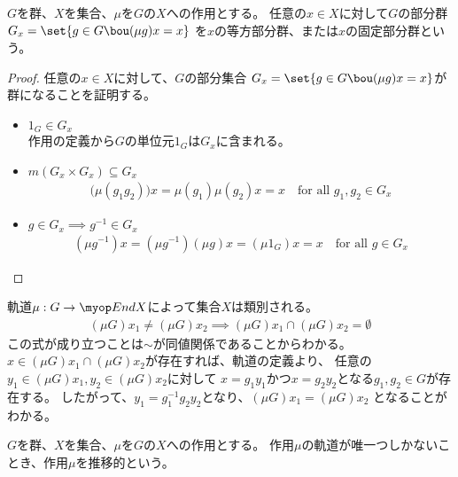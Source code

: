 	\begin{definition}[等方部分群]\label{def:等方部分群} %
		$G$を群、$X$を集合、$\mu$を$G$の$X$への作用とする。
		任意の$x\in X$に対して$G$の部分群$G_x=\set{g\in G\bou (\mu g)x=x}$
		を$x$の等方部分群、または$x$の固定部分群という。
	\end{definition} %
	\begin{proof} %
		任意の$x\in X$に対して、$G$の部分集合
		$G_x=\set{g\in G\bou (\mu g)x=x}$が群になることを証明する。
		\begin{itemize}\setlength{\itemsep}{-1mm} %
			\item $1_G\in G_x$ \\
			作用の定義から$G$の単位元$1_G$は$G_x$に含まれる。
			\item $m(G_x\times G_x)\subseteq G_x$
			\begin{equation*}\begin{split} %
				\bigl(\mu(g_1g_2)\bigr)x = \mu(g_1)\mu(g_2)x = x
				\quad\text{for all }g_1,g_2\in G_x
			\end{split}\end{equation*} %
			\item $g\in G_x\implies g^{-1}\in G_x$
			\begin{equation*}\begin{split} %
				(\mu g^{-1})x = (\mu g^{-1})(\mu g)x = (\mu 1_G)x = x
				\quad\text{for all }g\in G_x
			\end{split}\end{equation*} %
		\end{itemize} %
	\end{proof} %

	軌道$\mu:G\to\End X$によって集合$X$は類別される。
	\begin{equation*}\begin{split} %
		(\mu G)x_1 \neq (\mu G)x_2 
		\implies (\mu G)x_1 \cap (\mu G)x_2 = \emptyset
	\end{split}\end{equation*} %
	この式が成り立つことは$\sim$が同値関係であることからわかる。
	$x\in (\mu G)x_1 \cap (\mu G)x_2$が存在すれば、軌道の定義より、
	任意の$y_1\in (\mu G)x_1,y_2\in (\mu G)x_2$に対して
	$x = g_1y_1$かつ$x = g_2y_2$となる$g_1,g_2\in G $が存在する。
	したがって、$y_1=g_1^{-1}g_2y_2$となり、$(\mu G)x_1=(\mu G)x_2$
	となることがわかる。

	\begin{definition}[推移的な作用]\label{def:推移的な作用} %
		$G$を群、$X$を集合、$\mu$を$G$の$X$への作用とする。
		作用$\mu$の軌道が唯一つしかないことき、作用$\mu$を推移的という。
	\end{definition} %

